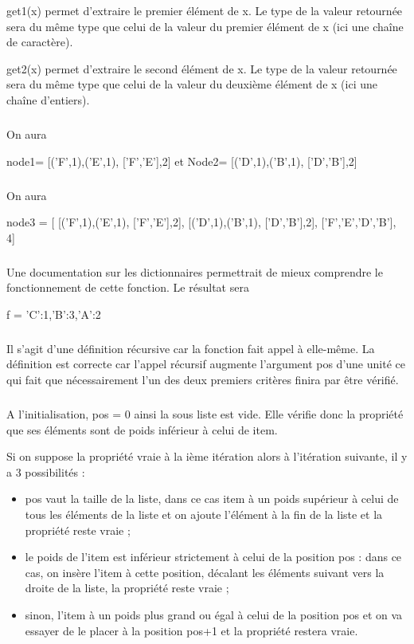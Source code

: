 \documentclass[10pt,fleqn]{article} %
\begin{document}
get1(x) permet d’extraire le premier élément de x. Le type de la valeur retournée sera du même type que celui de la valeur du premier élément de x (ici une chaîne de caractère).


get2(x) permet d’extraire le second élément de x. Le type de la valeur retournée sera du même type que celui de la valeur du deuxième élément de x (ici une chaîne d’entiers).


\subparagraph{}
On aura 
\begin{python}
node1= [('F',1),('E',1), ['F','E'],2] et Node2= [('D',1),('B',1), ['D','B'],2]
\end{python}

\subparagraph{}
On aura 
\begin{python}
node3 = [ [('F',1),('E',1), ['F','E'],2], [('D',1),('B',1), ['D','B'],2], ['F','E','D','B'], 4]
\end{python}

\subparagraph{}
Une documentation sur les dictionnaires permettrait de mieux comprendre le fonctionnement de cette fonction. Le résultat sera 
\begin{python}
f = {'C':1,'B':3,'A':2}
\end{python}

\subparagraph{}
Il s’agit d’une définition récursive car la fonction fait appel à elle-même. La définition est correcte car l’appel récursif augmente l’argument pos d’une unité ce qui fait que nécessairement l’un des deux premiers critères finira par être vérifié.

\subparagraph{}
A l’initialisation, pos = 0 ainsi la sous liste est vide. Elle vérifie donc la propriété que ses éléments sont de poids inférieur à celui de item.

Si on suppose la propriété vraie à la ième itération alors à l’itération suivante, il y a 3 possibilités :
\begin{itemize}
\item pos vaut la taille de la liste, dans ce cas item à un poids supérieur à celui de tous les éléments de la liste et on ajoute l’élément à la fin de la liste et la propriété reste vraie ; 
\item le poids de l’item est inférieur strictement à celui de la position pos : dans ce cas, on insère l’item 
à	cette position, décalant les éléments suivant vers la droite de la liste, la propriété reste vraie ; 
\item sinon, l’item à un poids plus grand ou égal à celui de la position pos et on va essayer de le placer 
à	la position pos+1 et la propriété restera vraie. 
\end{itemize}
\subparagraph{}
\end{document}
